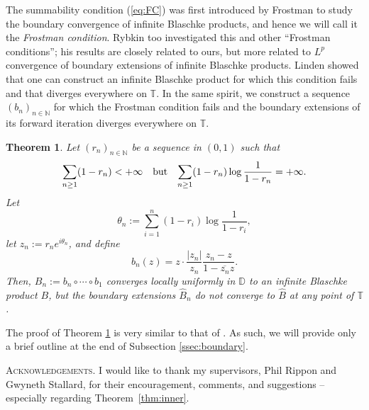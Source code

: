 \documentclass[a4paper,11pt]{article}
\theoremstyle{plain}
\newtheorem{theorem}{Theorem}[section]
\theoremstyle{definition}
\theoremstyle{definition}
\def\D{\mathbb{D}}
\begin{document}
The summability condition (\ref{eq:FC}) was first introduced by Frostman \cite{Fro42} to study the boundary convergence of infinite Blaschke products, and hence we will call it the \textit{Frostman condition}. Rybkin \cite{Ryb91} too investigated this and other ``Frostman conditions''; his results are closely related to ours, but more related to $L^p$ convergence of boundary extensions of infinite Blaschke products. Linden \cite{Lin76} showed that one can construct an infinite Blaschke product for which this condition fails and that diverges everywhere on $\mathbb{T}$. In the same spirit, we construct a sequence $(b_n)_{n\in\mathbb{N}}$ for which the Frostman condition fails and the boundary extensions of its forward iteration diverges everywhere on $\mathbb{T}$.
\begin{theorem} \label{thm:ex}
Let $(r_n)_{n\in\mathbb{N}}$ be a sequence in $(0, 1)$ such that
\[ \text{$\sum_{n\geq 1} (1 - r_n) < +\infty$\quad but\quad $\sum_{n\geq 1} (1 - r_n)\log\frac{1}{1 - r_n} = +\infty$.} \]
Let
\[ \theta_n := \sum_{i=1}^n (1 - r_i)\log\frac{1}{1 - r_i}, \]
let $z_n := r_ne^{i\theta_n}$, and define
\[ b_n(z) = z\cdot\frac{|z_n|}{z_n}\frac{z_n - z}{1 - \overline{z_n}z}. \]
Then, $B_n := b_n\circ\cdots\circ b_1$ converges locally uniformly in $\D$ to an infinite Blaschke product $B$, but the boundary extensions $\hat{B}_n$ do not converge to $\hat{B}$ at any point of $\mathbb{T}$.
\end{theorem}
The proof of Theorem \ref{thm:ex} is very similar to that of \cite[Theorem]{Lin76}. As such, we will provide only a brief outline at the end of Subsection \ref{ssec:boundary}.

\noindent\textsc{Acknowledgements.} I would like to thank my supervisors, Phil Rippon and Gwyneth Stallard, for their encouragement, comments, and suggestions -- especially regarding Theorem~\ref{thm:inner}.
\end{document}
